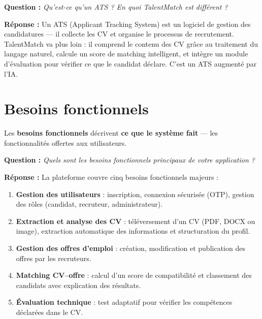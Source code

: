 \documentclass[12pt,a4paper]{article}
\newenvironment{boite}{%
  \def\FrameCommand{\fboxsep=8pt\colorbox{bleulight}}%
  \MakeFramed{\advance\hsize-\width \FrameRestore}%
  \vspace{-4pt}%
}{\endMakeFramed}
\newenvironment{jury}{%
  \def\FrameCommand{\fboxsep=8pt\colorbox{orange!12}}%
  \MakeFramed{\advance\hsize-\width \FrameRestore}%
  \vspace{-4pt}%
}{\endMakeFramed}
\newenvironment{reponse}{%
  \def\FrameCommand{\fboxsep=8pt\colorbox{green!10}}%
  \MakeFramed{\advance\hsize-\width \FrameRestore}%
  \vspace{-4pt}%
}{\endMakeFramed}
\newcommand{\concept}[1]{\textbf{\color{bleu}#1}}
\newcommand{\Q}[1]{\vspace{6pt}\noindent\textbf{\color{orange}Question :} \textit{#1}}
\newcommand{\R}[1]{\noindent\textbf{\color{vert}Réponse :} #1\vspace{6pt}}
\begin{document}
\begin{jury}
\Q{Qu'est-ce qu'un ATS ? En quoi TalentMatch est différent ?}
\end{jury}

\begin{reponse}
\R{Un ATS (Applicant Tracking System) est un logiciel de gestion des candidatures — il collecte les CV et organise le processus de recrutement.
TalentMatch va plus loin : il comprend le contenu des CV grâce au traitement du langage naturel, calcule un score de matching intelligent, et intègre un module d'évaluation pour vérifier ce que le candidat déclare.
C'est un ATS augmenté par l'IA.}
\end{reponse}

\section{Besoins fonctionnels}

\begin{boite}
Les \concept{besoins fonctionnels} décrivent \textbf{ce que le système fait} — les fonctionnalités offertes aux utilisateurs.
\end{boite}

\vspace{8pt}

\begin{jury}
\Q{Quels sont les besoins fonctionnels principaux de votre application ?}
\end{jury}

\begin{reponse}
\R{La plateforme couvre cinq besoins fonctionnels majeurs :
\begin{enumerate}[leftmargin=1.5cm]
  \item \textbf{Gestion des utilisateurs} : inscription, connexion sécurisée (OTP), gestion des rôles (candidat, recruteur, administrateur).
  \item \textbf{Extraction et analyse des CV} : téléversement d'un CV (PDF, DOCX ou image), extraction automatique des informations et structuration du profil.
  \item \textbf{Gestion des offres d'emploi} : création, modification et publication des offres par les recruteurs.
  \item \textbf{Matching CV–offre} : calcul d'un score de compatibilité et classement des candidats avec explication des résultats.
  \item \textbf{Évaluation technique} : test adaptatif pour vérifier les compétences déclarées dans le CV.
\end{enumerate}}
\end{reponse}
\end{document}
